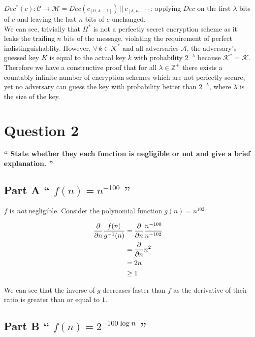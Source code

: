 \documentclass{article}
\newcommand{\HomeworkText}[1]{\textbf{``#1''}\\}
\begin{document}
    $Dec^{*}(c) : \mathcal{C} \to \mathcal{M} = Dec(c_{[0,\lambda-1]}) \,||\, c_{[\lambda,n-1]}$; applying $Dec$ on the first $\lambda$ bits of $c$ and leaving the last $n$ bits of $c$ unchanged.\\
    
    We can see, trivially that $\Pi^{*}$ is not a perfectly secret encryption scheme as it leaks the trailing $n$ bits of the message, violating the requirement of perfect indistinguishablity. However, $\forall\, k \in \mathcal{K}^{*}$ and all adversaries $\mathcal{A}$, the adversary's guessed key $K$ is equal to the actual key $k$ with probability $2^{-\lambda}$ because $\mathcal{K}^{*} = \mathcal{K}$.    
    Therefore we have a constructive proof that for all $\lambda \in \mathbb{Z}^{+}$ there exists a countably infinite number of encryption schemes which are not perfectly secure, yet no adversary can guess the key with probability better than $2^{-\lambda}$, where $\lambda$ is the size of the key.


	\clearpage
	\section*{Question 2}
	\HomeworkText{
		State whether they each function is negligible or not and give a brief explanation.
	}

	\subsection*{Part A
	\HomeworkText{
		$f(n) = n^{-100}$
	}}

	$f$ is \emph{not} negligible. Consider the polynomial function $g(n) = n^{102}$
	
	\begin{equation}
	\begin{split}
	\pdv{}{n} \frac{f(n)}{g^{-1}(n)} & = \pdv{}{n} \frac{n^{-100}}{n^{-102}} \\
	  & = \pdv{}{n} n^2 \\
	  & = 2n \\
	  & \ge 1
	\end{split}
	\end{equation}
	
	We can see that the inverse of $g$ decreases faster than $f$ as the derivative of their ratio is greater than or equal to $1$.

	\subsection*{Part B
	\HomeworkText{
		$f(n) = 2^{-100 \log n}$
	}}
\end{document}
